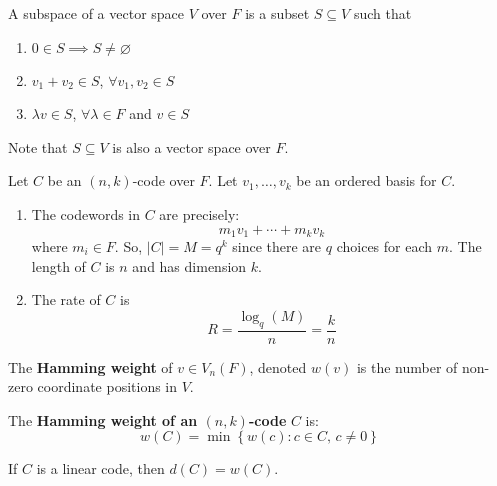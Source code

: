 \begin{defbox}
    \begin{definition}
        A subspace of a vector space $ V $ over $ F $ is a subset
        $ S\subseteq V $ such that
        \begin{enumerate}[V1]
            \item $ 0\in S \implies S\neq \varnothing $
            \item $ v_1+v_2\in S $, $ \forall v_1,v_2\in S $
            \item $ \lambda v\in S $, $ \forall \lambda\in F $ and $ v\in S $
        \end{enumerate}
        Note that $ S\subseteq V $ is also a vector space over $ F $.
    \end{definition}
\end{defbox}

Let $ C $ be an $ (n,k) $-code over $ F $. Let $ v_1,\ldots,v_k $ be
an ordered basis for $ C $.
\begin{enumerate}[(1)]
    \item The codewords in $ C $ are precisely:
          \[ m_1v_1+\cdots +m_kv_k \]
          where $ m_i\in F $. So, $ |C|=M=q^k $ since there are $ q $ choices for each $ m $.
          The length of $ C $ is $ n $ and has dimension $ k $.
    \item The rate of $ C $ is
          \[ R=\frac{\log_q(M)}{n} =\frac{k}{n} \]
\end{enumerate}

\begin{defbox}
    \begin{definition}
        The \textbf{Hamming weight} of $ v\in V_n(F) $, denoted
        $ w(v) $ is the number of non-zero coordinate positions in $ V $.
    \end{definition}
 \end{defbox}

\begin{defbox}
    \begin{definition}
        The \textbf{Hamming weight of an $ (n,k) $-code} $ C $ is:
        \[ w(C)=\min \left\{ w(c):c\in C,\,c\neq 0\right\} \]
    \end{definition} 
\end{defbox}

\begin{thmbox}
    \begin{theorem}
        If $ C $ is a linear code, then $ d(C)=w(C) $.
    \end{theorem} 
\end{thmbox}

